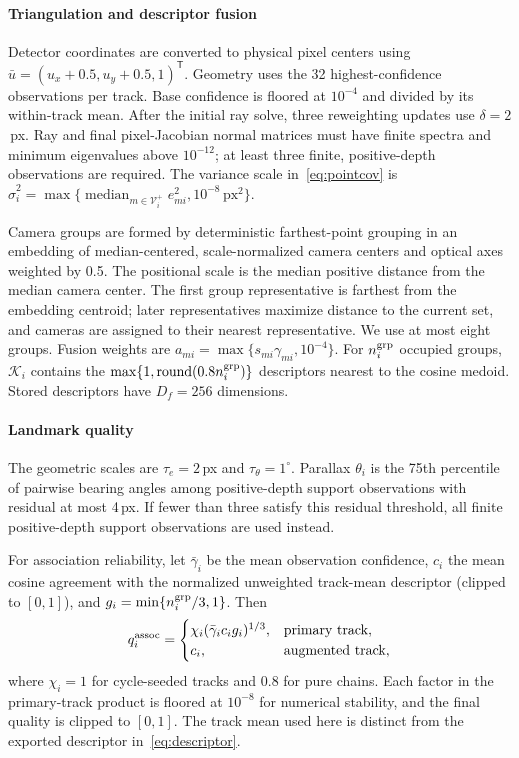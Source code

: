 \paragraph{Triangulation and descriptor fusion}
Detector coordinates are converted to physical pixel centers using $\bar u=(u_x+0.5,u_y+0.5,1)^\mathsf T$. Geometry uses the 32 highest-confidence observations per track. Base confidence is floored at $10^{-4}$ and divided by its within-track mean. After the initial ray solve, three reweighting updates use $\delta=2$\,px. Ray and final pixel-Jacobian normal matrices must have finite spectra and minimum eigenvalues above $10^{-12}$; at least three finite, positive-depth observations are required. The variance scale in~\eqref{eq:pointcov} is
$\widehat\sigma_i^2=\max\{\operatorname{median}_{m\in\mathcal V_i^+}e_{mi}^2,10^{-8}\,\mathrm{px}^2\}$.

Camera groups are formed by deterministic farthest-point grouping in an embedding of median-centered, scale-normalized camera centers and optical axes weighted by 0.5. The positional scale is the median positive distance from the median camera center. The first group representative is farthest from the embedding centroid; later representatives maximize distance to the current set, and cameras are assigned to their nearest representative. We use at most eight groups. Fusion weights are $a_{mi}=\max\{s_{mi}\gamma_{mi},10^{-4}\}$. For $n_i^{\rm grp}$ occupied groups, $\mathcal K_i$ contains the $\max\{1,\operatorname{round}(0.8n_i^{\rm grp})\}$ descriptors nearest to the cosine medoid. Stored descriptors have $D_f=256$ dimensions.

\paragraph{Landmark quality}
The geometric scales are $\tau_e=2$\,px and $\tau_\theta=1^\circ$. Parallax $\theta_i$ is the 75th percentile of pairwise bearing angles among positive-depth support observations with residual at most 4\,px. If fewer than three satisfy this residual threshold, all finite positive-depth support observations are used instead.

For association reliability, let $\bar\gamma_i$ be the mean observation confidence, $c_i$ the mean cosine agreement with the normalized unweighted track-mean descriptor (clipped to $[0,1]$), and $g_i=\min\{n_i^{\rm grp}/3,1\}$. Then
\begin{equation}
q_i^{\rm assoc}=\begin{cases}
\chi_i(\bar\gamma_i c_i g_i)^{1/3},&\text{primary track},\\
c_i,&\text{augmented track},
\end{cases}
\label{eq:quality_implementation}
\end{equation}
where $\chi_i=1$ for cycle-seeded tracks and $0.8$ for pure chains. Each factor in the primary-track product is floored at $10^{-8}$ for numerical stability, and the final quality is clipped to $[0,1]$. The track mean used here is distinct from the exported descriptor in~\eqref{eq:descriptor}.

